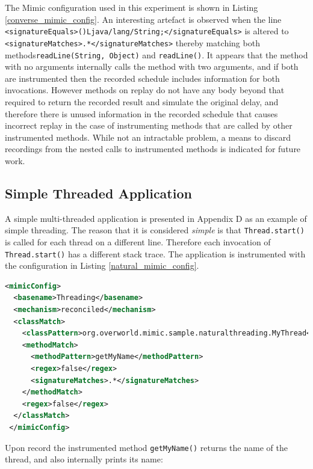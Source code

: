 \documentclass[]{final_report}
\begin{document}
The Mimic configuration used in this experiment is shown in Listing \ref{converse_mimic_config}. An interesting artefact is observed when the line \lstinline{<signatureEquals>()Ljava/lang/String;</signatureEquals>} is altered to \lstinline{<signatureMatches>.*</signatureMatches>} thereby matching both methods\linebreak[4]\lstinline{readLine(String, Object)} and \lstinline{readLine()}. It appears that the method with no arguments internally calls the method with two arguments, and if both are instrumented then the recorded schedule includes information for both invocations. However methods on replay do not have any body beyond that required to return the recorded result and simulate the original delay, and therefore there is unused information in the recorded schedule that causes incorrect replay in the case of instrumenting methods that are called by other instrumented methods. While not an intractable problem, a means to discard recordings from the nested calls to instrumented methods is indicated for future work.

\subsection*{Simple Threaded Application \label{simple_threading}}

A simple multi-threaded application is presented in Appendix D as an example of simple threading. The reason that it is considered \textit{simple} is that \lstinline{Thread.start()}\noop{} is called for each thread on a different line. Therefore each invocation of \lstinline{Thread.start()}\noop{} has a different stack trace. The application is instrumented with the configuration in Listing \ref{natural_mimic_config}.

\begin{lstlisting}[language=xml, caption=Mimic Configuration to Record and Replay a Simple Threaded Application, label={natural_mimic_config}]
<mimicConfig>
  <basename>Threading</basename>
  <mechanism>reconciled</mechanism>
  <classMatch>
    <classPattern>org.overworld.mimic.sample.naturalthreading.MyThread</classPattern>
    <methodMatch>
      <methodPattern>getMyName</methodPattern>
      <regex>false</regex>
      <signatureMatches>.*</signatureMatches>
    </methodMatch>
    <regex>false</regex>
  </classMatch>
 </mimicConfig>
\end{lstlisting}

Upon record the instrumented method \lstinline{getMyName()}\noop{} returns the name of the thread, and also internally prints its name:
\end{document}
